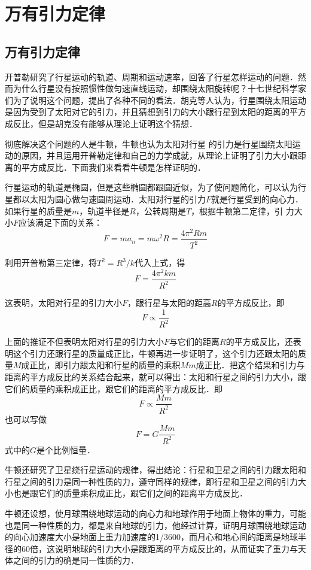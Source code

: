 \section{万有引力定律}
\subsection{万有引力定律}

开普勒研究了行星运动的轨道、周期和运动速率，回答了行星怎样运动的问题．然而为什么行星没有按照惯性做匀速直线运动，却围绕太阳旋转呢？十七世纪科学家们为了说明这个问题，提出了各种不同的看法．胡克等人认为，行星围绕太阳运动是因为受到了太阳对它的引力，并且猜想到引力的大小跟行星到太阳的距离的平方成反比，但是胡克没有能够从理论上证明这个猜想．

彻底解决这个问题的人是牛顿，牛顿也认为太阳对行星
的引力是行星围绕太阳运动的原因，并且运用开普勒定律和自己的力学成就，从理论上证明了引力大小跟距离的平方成反比．下面我们来看看牛顿是怎样证明的．

行星运动的轨道是椭圆，但是这些椭圆都跟圆近似，为了使问题简化，可以认为行星都以太阳为圆心做匀速圆周运动．太阳对行星的引力$F$就是行星受到的向心力．如果行星的质量是$m$，轨道半径是$R$，公转周期是$T$，根据牛顿第二定律，引
力大小$F$应该满足下面的关系：
\[F=ma_n=m\omega^2 R=\frac{4\pi^2 Rm}{T^2} \]

利用开普勒第三定律，将$T^2=R^3/k$代入上式，得
\[F=\frac{4\pi^2km}{R^2} \]

这表明，太阳对行星的引力大小$F$，跟行星与太阳的距高$R$的平方成反比，即
\[F\propto \frac{1}{R^2} \]

上面的推证不但表明太阳对行星的引力大小$F$与它们的距离$R$的平方成反比，还表明这个引力还跟行星的质量成正比，牛顿再进一步证明了，这个引力还跟太阳的质量$M$成正比，即引力跟太阳和行星的质量的乘积$Mm$成正比．把这个结果和引力与距离的平方成反比的关系结合起来，就可以得出：太阳和行星之间的引力大小，跟它们的质量的乘积成正比，跟它们的距离的平方成反比．即
\[F\propto \frac{Mm}{R^2} \]
也可以写做
\[F=G\frac{Mm}{R^2} \]
式中的$G$是个比例恒量．

牛顿还研究了卫星绕行星运动的规律，得出结论：行星和卫星之间的引力跟太阳和行星之间的引力是同一种性质的力，遵守同样的规律，即行星和卫星之间的引力大小也是跟它们的质量乘积成正比，跟它们之间的距离平方成反比．

牛顿还设想，使月球围绕地球运动的向心力和地球作用于地面上物体的重力，可能也是同一种性质的力，都是来自地球的引力，他经过计算，证明月球围绕地球运动的向心加速度大小是地面上重力加速度的1/3600，而月心和地心间的距离是地球半径的60倍，这说明地球的引力大小是跟距离的平方成反比的，从而证实了重力与天体之间的引力的确是同一性质的力．

